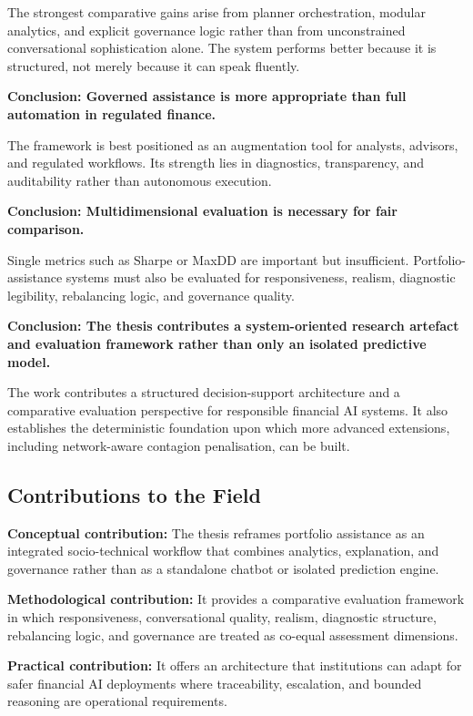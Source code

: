 \documentclass[11pt]{article}
\newcommand{\conclusion}[1]{{\large\textbf{\textcolor{conclusionblue}{Conclusion: }}\textbf{#1}}}
\begin{document}
The strongest comparative gains arise from planner orchestration, modular analytics, and explicit governance logic rather than from unconstrained conversational sophistication alone. The system performs better because it is structured, not merely because it can speak fluently.

\conclusion{Governed assistance is more appropriate than full automation in regulated finance.}

The framework is best positioned as an augmentation tool for analysts, advisors, and regulated workflows. Its strength lies in diagnostics, transparency, and auditability rather than autonomous execution.

\conclusion{Multidimensional evaluation is necessary for fair comparison.}

Single metrics such as Sharpe or MaxDD are important but insufficient. Portfolio-assistance systems must also be evaluated for responsiveness, realism, diagnostic legibility, rebalancing logic, and governance quality.

\conclusion{The thesis contributes a system-oriented research artefact and evaluation framework rather than only an isolated predictive model.}

The work contributes a structured decision-support architecture and a comparative evaluation perspective for responsible financial AI systems. It also establishes the deterministic foundation upon which more advanced extensions, including network-aware contagion penalisation, can be built.

\subsection{Contributions to the Field}

\textbf{Conceptual contribution:} The thesis reframes portfolio assistance as an integrated socio-technical workflow that combines analytics, explanation, and governance rather than as a standalone chatbot or isolated prediction engine.

\textbf{Methodological contribution:} It provides a comparative evaluation framework in which responsiveness, conversational quality, realism, diagnostic structure, rebalancing logic, and governance are treated as co-equal assessment dimensions.

\textbf{Practical contribution:} It offers an architecture that institutions can adapt for safer financial AI deployments where traceability, escalation, and bounded reasoning are operational requirements.
\end{document}
